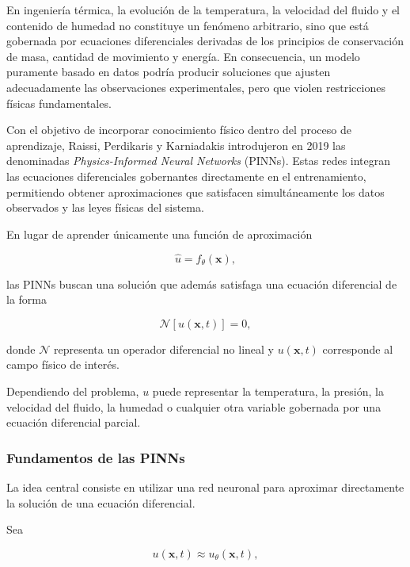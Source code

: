 En ingeniería térmica, la evolución de la temperatura, la velocidad del fluido y el contenido de humedad no constituye un fenómeno arbitrario, sino que está gobernada por ecuaciones diferenciales derivadas de los principios de conservación de masa, cantidad de movimiento y energía. En consecuencia, un modelo puramente basado en datos podría producir soluciones que ajusten adecuadamente las observaciones experimentales, pero que violen restricciones físicas fundamentales.

Con el objetivo de incorporar conocimiento físico dentro del proceso de aprendizaje, Raissi, Perdikaris y Karniadakis introdujeron en 2019 las denominadas \textit{Physics-Informed Neural Networks} (PINNs). Estas redes integran las ecuaciones diferenciales gobernantes directamente en el entrenamiento, permitiendo obtener aproximaciones que satisfacen simultáneamente los datos observados y las leyes físicas del sistema.

En lugar de aprender únicamente una función de aproximación

\[
\hat{u}=f_{\theta}(\mathbf{x}),
\]

las PINNs buscan una solución que además satisfaga una ecuación diferencial de la forma

\begin{equation}
\boxed{
\mathcal{N}[u(\mathbf{x},t)]=0,
}
\label{eq:pde_general}
\end{equation}

donde $\mathcal{N}$ representa un operador diferencial no lineal y $u(\mathbf{x},t)$ corresponde al campo físico de interés.

Dependiendo del problema, $u$ puede representar la temperatura, la presión, la velocidad del fluido, la humedad o cualquier otra variable gobernada por una ecuación diferencial parcial.

\subsubsection{Fundamentos de las PINNs}

La idea central consiste en utilizar una red neuronal para aproximar directamente la solución de una ecuación diferencial.

Sea

\begin{equation}
u(\mathbf{x},t)
\approx
u_{\theta}(\mathbf{x},t),
\end{equation}

